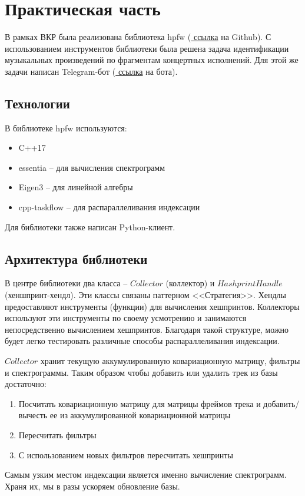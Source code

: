 \chapter{Практическая часть}
\label{cha:ch_2}

В рамках ВКР была реализована
библиотека hpfw (\href{https://github.com/kisasexypantera94/hpfw}{\color{blue} ссылка} на Github).
С использованием инструментов библиотеки была решена задача идентификации музыкальных
произведений по фрагментам концертных исполнений. Для этой же
задачи написан Telegram-бот (\href{https://t.me/hpfw_bot}{\color{blue} ссылка} на бота).

\section{Технологии}
В библиотеке hpfw используются:
\begin{itemize}
    \item C++17
    \item essentia -- для вычисления спектрограмм
    \item Eigen3 -- для линейной алгебры
    \item cpp-taskflow -- для распараллеливания индексации
\end{itemize}

Для библиотеки также написан Python-клиент.

\section{Архитектура библиотеки}
В центре библиотеки два класса -- $Collector$ (коллектор) и $HashprintHandle$ (хеншпринт-хендл).
Эти классы связаны паттерном <<Стратегия>>. Хендлы предоставляют инструменты (функции) для вычисления
хешпринтов. Коллекторы используют эти инструменты по своему усмотрению и занимаются непосредственно
вычислением хешпринтов. Благодаря такой структуре, можно будет легко тестировать различные способы
распараллеливания индексации.

$Collector$ хранит текущую аккумулированную ковариационную матрицу, фильтры и спектрограммы.
Таким образом чтобы добавить или удалить трек из базы достаточно:
\begin{enumerate}[label=\arabic*.]
    \item Посчитать ковариационную матрицу для матрицы фреймов трека и добавить/вычесть ее из
    аккумулированной ковариационной матрицы
    \item Пересчитать фильтры
    \item С использованием новых фильтров пересчитать хешпринты
\end{enumerate}
Самым узким местом индексации является именно вычисление спектрограмм. Храня их, мы в разы
ускоряем обновление базы.

